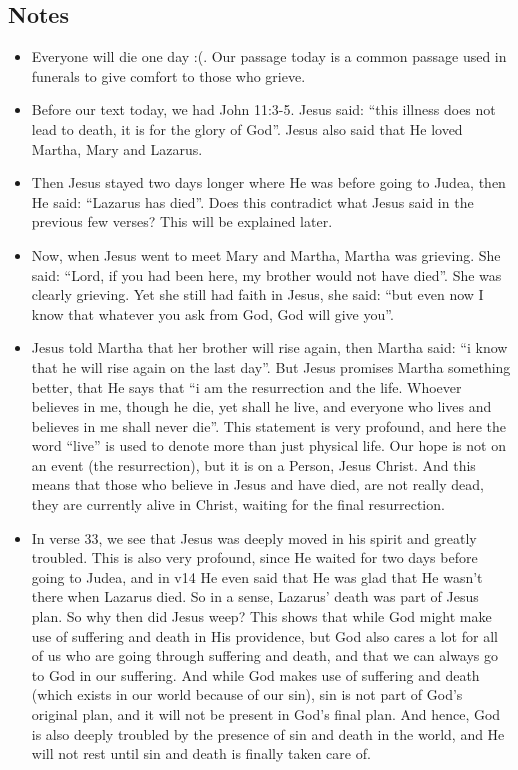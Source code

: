 \subsection*{Notes}
\begin{itemize}
  \item{Everyone will die one day :(. Our passage today is a common passage used in funerals to give comfort to those who grieve. }
  \item{Before our text today, we had John 11:3-5. Jesus said: “this illness does not lead to death, it is for the glory of God”. Jesus also said that He loved Martha, Mary and Lazarus. }
  \item{Then Jesus stayed two days longer where He was before going to Judea, then He said: “Lazarus has died”. Does this contradict what Jesus said in the previous few verses? This will be explained later.}
  \item{Now, when Jesus went to meet Mary and Martha, Martha was grieving. She said: “Lord, if you had been here, my brother would not have died”. She was clearly grieving. Yet she still had faith in Jesus, she said: “but even now I know that whatever you ask from God, God will give you”. }
  \item{Jesus told Martha that her brother will rise again, then Martha said: “i know that he will rise again on the last day”. But Jesus promises Martha something better, that He says that “i am the resurrection and the life. Whoever believes in me, though he die, yet shall he live, and everyone who lives and believes in me shall never die”. This statement is very profound, and here the word “live” is used to denote more than just physical life. Our hope is not on an event (the resurrection), but it is on a Person, Jesus Christ. And this means that those who believe in Jesus and have died, are not really dead, they are currently alive in Christ, waiting for the final resurrection.}
  \item{In verse 33, we see that Jesus was deeply moved in his spirit and greatly troubled. This is also very profound, since He waited for two days before going to Judea, and in v14 He even said that He was glad that He wasn’t there when Lazarus died. So in a sense, Lazarus’ death was part of Jesus plan. So why then did Jesus weep? This shows that while God might make use of suffering and death in His providence, but God also cares a lot for all of us who are going through suffering and death, and that we can always go to God in our suffering. And while God makes use of suffering and death (which exists in our world because of our sin), sin is not part of God’s original plan, and it will not be present in God’s final plan. And hence, God is also deeply troubled by the presence of sin and death in the world, and He will not rest until sin and death is finally taken care of.}

\end{itemize}
